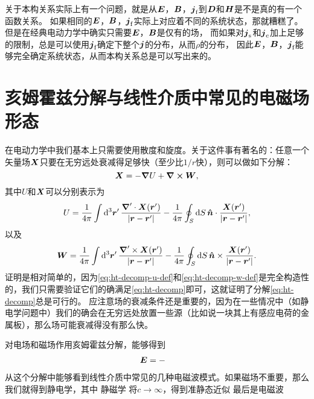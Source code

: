 关于本构关系实际上有一个问题，就是从$\vb*{E}$，$\vb*{B}$，$\vb*{j}_\text{f}$到$\vb*{D}$和$\vb*{H}$是不是真的有一个函数关系。
如果相同的$\vb*{E}$，$\vb*{B}$，$\vb*{j}_\text{f}$实际上对应着不同的系统状态，那就糟糕了。
但是在经典电动力学中确实只需要$\vb*{E}$，$\vb*{B}$是仅有的场，
而如果对$\vb*{j}_\text{s}$和$\vb*{j}_\text{c}$加上足够的限制，总是可以使用$\vb*{j}_\text{f}$确定下整个$\vb*{j}$的分布，从而$\rho$的分布，
因此$\vb*{E}$，$\vb*{B}$，$\vb*{j}_\text{f}$能够完全确定系统状态，从而本构关系总是可以写出来的。

\section{亥姆霍兹分解与线性介质中常见的电磁场形态}

在电动力学中我们基本上只需要使用散度和旋度。关于这件事有著名的：任意一个矢量场$\vb*{X}$只要在无穷远处衰减得足够快（至少比$1 / r$快），则可以做如下分解：
\begin{equation}
    \vb*{X} = - \grad{U} + \curl{\vb*{W}},
    \label{eq:ht-decomp}
\end{equation}
其中$U$和$\vb*{X}$可以分别表示为
\begin{equation}
    U = \frac{1}{4\pi} \int \dd[3]{\vb*{r}'} \frac{\grad' \cdot \vb*{X}(\vb*{r}')}{\abs{\vb*{r} - \vb*{r}'}} - \frac{1}{4\pi} \oint_S \dd{S} \vu*{n} \cdot \frac{\vb*{X}(\vb*{r}')}{\abs{\vb*{r} - \vb*{r}'}},
    \label{eq:ht-decomp-u-def}
\end{equation}
以及
\begin{equation}
    \vb*{W} = \frac{1}{4\pi} \int \dd[3]{\vb*{r}'} \frac{\grad' \times \vb*{X}(\vb*{r}')}{\abs{\vb*{r} - \vb*{r}'}} - \frac{1}{4\pi} \oint_S \dd{S} \vu*{n} \times \frac{\vb*{X}(\vb*{r}')}{\abs{\vb*{r} - \vb*{r}'}}.
    \label{eq:ht-decomp-w-def}
\end{equation}
证明是相对简单的，因为\eqref{eq:ht-decomp-u-def}和\eqref{eq:ht-decomp-w-def}是完全构造性的，我们只需要验证它们的确满足\eqref{eq:ht-decomp}即可，这就证明了分解\eqref{eq:ht-decomp}总是可行的。
应注意场的衰减条件还是重要的，因为在一些情况中（如静电学问题中）我们的确会在无穷远处放置一些源（比如说一块其上有感应电荷的金属板），那么场可能衰减得没有那么快。

对电场和磁场作用亥姆霍兹分解，能够得到
\begin{equation}
    \begin{aligned}
        \vb*{E} &= - 
    \end{aligned}
\end{equation}
从这个分解中能够看到线性介质中常见的几种电磁波模式。如果磁场不重要，那么我们就得到静电学，其中
静磁学
将$c \to \infty$，得到准静态近似
最后是电磁波

